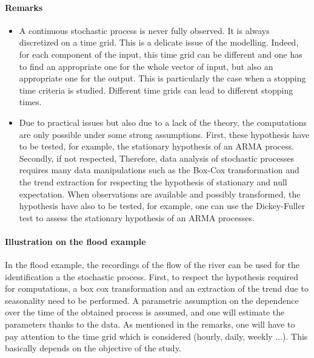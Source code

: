 \paragraph{Remarks}
\par
\begin{itemize}
\item A continuous stochastic process is never fully observed. It is always discretized on a time grid. This is a delicate issue of the modelling.
  Indeed, for each component of the input, this time grid can be different and one has to find an appropriate one for the whole vector of input, but also an appropriate one for the output.
  This is particularly the case when a stopping time criteria is studied. Different time grids can  lead to different stopping times.

\item Due to practical issues but also due to a lack of the theory, the computations are only possible under some strong assumptions. First, these hypothesis have to be tested,
  for example, the stationary hypothesis of an ARMA process. Secondly, if not respected, Therefore, data analysis of stochastic processes requires many data manipulations such as the Box-Cox transformation and the trend extraction for respecting the hypothesis of stationary and null expectation. When observations are available and possibly transformed, the hypothesis have also to be tested, for example, one can use the Dickey-Fuller test to assess the stationary hypothesis of an ARMA processes.
\end{itemize}




\paragraph{Illustration on the flood example}
\par

In the flood example, the recordings of the flow of the river can be used for the identification a the stochastic process. First, to respect the hypothesis required for computations,
a box cox transformation and an extraction of the trend due to seasonality need to be performed. A parametric assumption on the dependence over the time of the obtained
process is assumed, and one will estimate the parameters thanks to the data. As mentioned in the remarks, one will have to pay attention to the time grid which is considered
(hourly, daily, weekly ...). This basically depends on the objective of the study.


